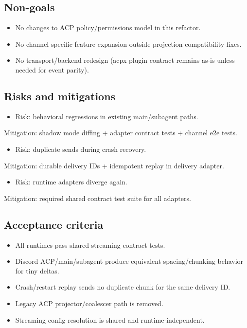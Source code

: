 \subsection{Non-goals}


\begin{itemize}
  \item No changes to ACP policy/permissions model in this refactor.
  \item No channel-specific feature expansion outside projection compatibility fixes.
  \item No transport/backend redesign (acpx plugin contract remains as-is unless needed for event parity).
\end{itemize}


\subsection{Risks and mitigations}


\begin{itemize}
  \item Risk: behavioral regressions in existing main/subagent paths.
\end{itemize}

Mitigation: shadow mode diffing + adapter contract tests + channel e2e tests.
\begin{itemize}
  \item Risk: duplicate sends during crash recovery.
\end{itemize}

Mitigation: durable delivery IDs + idempotent replay in delivery adapter.
\begin{itemize}
  \item Risk: runtime adapters diverge again.
\end{itemize}

Mitigation: required shared contract test suite for all adapters.

\subsection{Acceptance criteria}


\begin{itemize}
  \item All runtimes pass shared streaming contract tests.
  \item Discord ACP/main/subagent produce equivalent spacing/chunking behavior for tiny deltas.
  \item Crash/restart replay sends no duplicate chunk for the same delivery ID.
  \item Legacy ACP projector/coalescer path is removed.
  \item Streaming config resolution is shared and runtime-independent.
\end{itemize}



